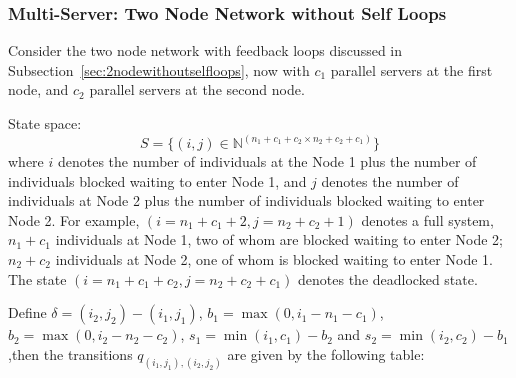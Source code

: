 \documentclass{article}
\begin{document}
\subsubsection{Multi-Server: Two Node Network without Self Loops}
Consider the two node network with feedback loops discussed in Subsection~\ref{sec:2nodewithoutselfloops}, now with $c_1$ parallel servers at the first node, and $c_2$ parallel servers at the second node.

State space:
        \[S = \{(i,j)\in\mathbb{N}^{(n_1+c_1+c_2\times n_2+c_2+c_1)}\}\]
where $i$ denotes the number of individuals at the Node 1 plus the number of individuals blocked waiting to enter Node 1, and $j$ denotes the number of individuals at Node 2 plus the number of individuals blocked waiting to enter Node 2.
For example, $(i=n_1+c_1+2, j=n_2+c_2+1)$ denotes a full system, $n_1+c_1$ individuals at Node 1, two of whom are blocked waiting to enter Node 2; $n_2+c_2$ individuals at Node 2, one of whom is blocked waiting to enter Node 1.
The state $(i=n_1+c_1+c_2, j=n_2+c_2+c_1)$ denotes the deadlocked state.

Define $\delta = (i_2, j_2) - (i_1, j_1)$, $b_1 = \max(0, i_1-n_1-c_1)$, $b_2 = \max(0, i_2-n_2-c_2)$, $s_1 = \min(i_1, c_1)-b_2$ and $s_2 = \min(i_2, c_2)-b_1$ ,then the transitions $q_{(i_1, j_1),(i_2, j_2)}$ are given by the following table:
\end{document}
